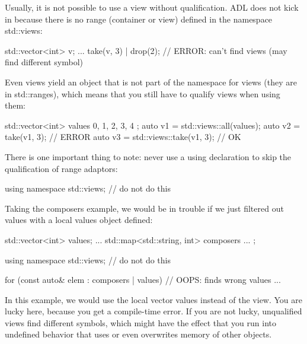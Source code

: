 Usually, it is not possible to use a view without qualification. ADL does not kick in because there is no range (container or view) defined in the namespace std::views:

\begin{cpp}
std::vector<int> v;
...
take(v, 3) | drop(2); // ERROR: can’t find views (may find different symbol)
\end{cpp}

Even views yield an object that is not part of the namespace for views (they are in std::ranges), which means that you still have to qualify views when using them:

\begin{cpp}
std::vector<int> values{ 0, 1, 2, 3, 4 };
auto v1 = std::views::all(values);
auto v2 = take(v1, 3); // ERROR
auto v3 = std::views::take(v1, 3); // OK
\end{cpp}

There is one important thing to note: never use a using declaration to skip the qualification of range adaptors:

\begin{cpp}
using namespace std::views; // do not do this
\end{cpp}

Taking the composers example, we would be in trouble if we just filtered out values with a local values object defined:

\begin{cpp}
std::vector<int> values;
...
std::map<std::string, int> composers{ ... };

using namespace std::views; // do not do this

for (const auto& elem : composers | values) { // OOPS: finds wrong values
	...
}
\end{cpp}

In this example, we would use the local vector values instead of the view. You are lucky here, because you get a compile-time error. If you are not lucky, unqualified views find different symbols, which might have the effect that you run into undefined behavior that uses or even overwrites memory of other objects.
